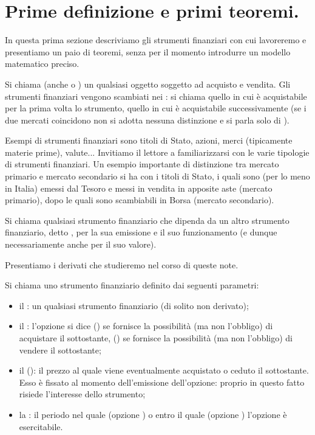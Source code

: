 \section{Prime definizione e primi teoremi.}\label{PrimeDefinizioniEPrimiTeoremi}
\par In questa prima sezione descriviamo gli strumenti finanziari con cui lavoreremo e presentiamo un paio di teoremi, senza per il momento introdurre un modello matematico preciso.
\begin{Definition}\label{AttivoIntuitivo}
	Si chiama  (anche  o ) un qualsiasi oggetto soggetto ad acquisto e vendita. Gli strumenti finanziari vengono scambiati nei : si chiama  quello in cui \`e acquistabile per la prima volta lo strumento,  quello in cui \`e acquistabile successivamente (se i due mercati coincidono non si adotta nessuna distinzione e si parla solo di ).
\end{Definition}
	Esempi di strumenti finanziari sono titoli di Stato, azioni, merci (tipicamente materie prime), valute... Invitiamo il lettore a familiarizzarsi con le varie tipologie di strumenti finanziari. Un esempio importante di distinzione tra mercato primario e mercato secondario si ha con i titoli di Stato, i quali sono (per lo meno in Italia) emessi dal Tesoro e messi in vendita in apposite aste (mercato primario), dopo le quali sono scambiabili in Borsa (mercato secondario).
\begin{Definition}
	Si chiama  qualsiasi strumento finanziario che dipenda da un altro strumento finanziario, detto , per la sua emissione e il suo funzionamento (e dunque necessariamente anche per il suo valore).
\end{Definition}
	\par Presentiamo i derivati che studieremo nel corso di queste note.
\begin{Definition}
	Si chiama  uno strumento finanziario definito dai seguenti parametri:
	\begin{itemize}
		\item il : un qualsiasi strumento finanziario (di solito non derivato);
		\item il : l'opzione si dice  (\Call) se fornisce la possibilit\`a (ma non l'obbligo) di acquistare il sottostante,  (\Put) se fornisce la possibilit\`a (ma non l'obbligo) di vendere il sottostante;
		\item il  (\Strike): il prezzo al quale viene eventualmente acquistato o ceduto il sottostante. Esso \`e fissato al momento dell'emissione dell'opzione: proprio in questo fatto risiede l'interesse dello strumento;
		\item la : il periodo nel quale (opzione ) o entro il quale (opzione ) l'opzione \`e esercitabile.
	\end{itemize}
\end{Definition}
